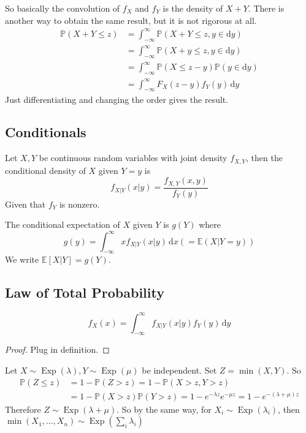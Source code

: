 So basically the convolution of $f_X$ and $f_Y$ is the density of $X+Y$.
There is another way to obtain the same result, but it is not rigorous at all.
\begin{align*}
    \mathbb P(X+Y\le z)&=\int_{-\infty}^\infty\mathbb P(X+Y\le z,y\in\mathrm dy)\\
    &=\int_{-\infty}^\infty\mathbb P(X+y\le z,y\in\mathrm dy)\\
    &=\int_{-\infty}^\infty\mathbb P(X\le z-y)\mathbb P(y\in\mathrm dy)\\
    &=\int_{-\infty}^\infty F_X(z-y)f_Y(y)\,\mathrm dy
\end{align*}
Just differentiating and changing the order gives the result.
\subsection{Conditionals}
\begin{definition}
    Let $X,Y$ be continuous random variables with joint density $f_{X,Y}$, then the conditional density of $X$ given $Y=y$ is
    $$f_{X|Y}(x|y)=\frac{f_{X,Y}(x,y)}{f_Y(y)}$$
    Given that $f_Y$ is nonzero.
\end{definition}
\begin{definition}
    The conditional expectation of $X$ given $Y$ is $g(Y)$ where
    $$g(y)=\int_{-\infty}^\infty xf_{X|Y}(x|y)\,\mathrm dx(=\mathbb E(X|Y=y))$$
    We write $\mathbb E[X|Y]=g(Y)$.
\end{definition}
\subsection{Law of Total Probability}
\begin{proposition}
    $$f_X(x)=\int_{-\infty}^\infty f_{X|Y}(x|y)f_Y(y)\,\mathrm dy$$
\end{proposition}
\begin{proof}
    Plug in definition.
\end{proof}
\begin{example}
    Let $X\sim\operatorname{Exp}(\lambda),Y\sim\operatorname{Exp}(\mu)$ be independent.
    Set $Z=\min(X,Y)$.
    So
    \begin{align*}
        \mathbb P(Z\le z)&=1-\mathbb P(Z>z)=1-\mathbb P(X>z,Y>z)\\
        &=1-\mathbb P(X>z)\mathbb P(Y>z)=1-e^{-\lambda z}e^{-\mu z}=1-e^{-(\lambda+\mu)z}
    \end{align*}
    Therefore $Z\sim\operatorname{Exp}(\lambda+\mu)$.
    So by the same way, for $X_i\sim\operatorname{Exp}(\lambda_i)$, then $\min(X_1,\ldots,X_n)\sim \operatorname{Exp}(\sum_i\lambda_i)$
\end{example}
